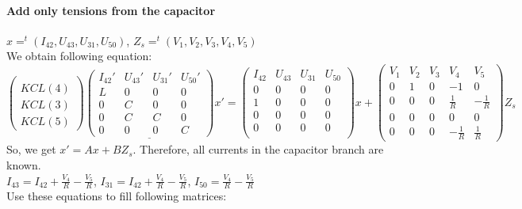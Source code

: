 \paragraph{Add only tensions from the capacitor}
$x=^{t}(I_{42},U_{43},U_{31},U_{50})$,
$Z_{s}=^{t}(V_{1},V_{2},V_{3},V_{4},V_{5})$\\
We obtain following equation:
\[
\left(\begin{array}{c}
  \\  KCL(4)\\  KCL(3)\\  KCL(5)
\end{array}\right)
\underline{
\left(\begin{array}{cccc}
  I_{42}'&U_{43}'&U_{31}'&U_{50}'\\
  \hline
L&0&0&0\\
0&C&0&0\\
0&C&C&0\\
0&0&0&C
\end{array}\right)}x'=
\left(\begin{array}{cccc}
  I_{42}&U_{43}&U_{31}&U_{50}\\
  \hline
0&0&0&0\\
1&0&0&0\\
0&0&0&0\\
0&0&0&0\\ 
\end{array}\right)x+
\left(\begin{array}{ccccc}
V_{1}&V_{2}&V_{3}&V_{4}&V_{5}\\
  \hline
  0&1&0&-1&0\\
  0&0&0&\frac{1}{R}&-\frac{1}{R}\\
  0&0&0&0&0\\
  0&0&0&-\frac{1}{R}&\frac{1}{R}
\end{array}\right)Z_{s}
\]
So, we get $x'=Ax+BZ_{s}$. Therefore, all currents in the capacitor branch are known.\\
$I_{43}= I_{42}+\frac{V_{4}}{R}-\frac{V_{5}}{R}$,
$I_{31}= I_{42}+\frac{V_{4}}{R}-\frac{V_{5}}{R}$,
$I_{50}= \frac{V_{4}}{R}-\frac{V_{5}}{R}$\\
Use these equations to fill following matrices:
